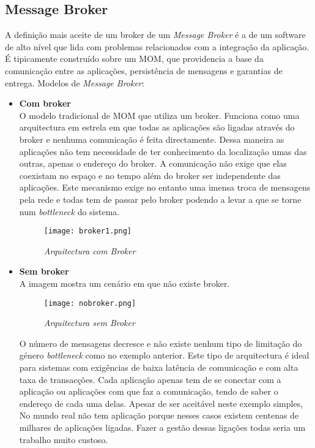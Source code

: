 \subsection{Message Broker}
A definição mais aceite de um broker de um \textit{Message Broker} é a de um software de alto nível que lida com problemas relacionados com a integração da aplicação. É tipicamente construído sobre um MOM, que providencia a base da comunicação entre as aplicações, persistência de mensagens e garantias de entrega. Modelos de \textit{Message Broker}:
\begin{itemize}
\item \textbf{Com broker}\\
 O modelo tradicional de MOM que utiliza um broker. Funciona como uma arquitectura em estrela em que todas as aplicações são ligadas através do broker e nenhuma comunicação é feita directamente. Dessa maneira as aplicações não tem necessidade de ter conhecimento da localização umas das outras, apenas o endereço do broker. A comunicação não exige que elas coexistam no espaço e no tempo além do broker ser independente das aplicações. Este mecanismo exige no entanto uma imensa troca de mensagens pela rede e todas tem de passar pelo broker podendo a levar a que se torne num \textit{bottleneck} do sistema.
\begin{figure}[H]
\centering
\texttt{[image: broker1.png]}
\caption{\textit{Arquitectura com Broker}}
\label{fig:broker}
\end{figure}
\item \textbf{Sem broker}\\
A imagem mostra um cenário em que não existe broker.
\begin{figure}[H]
\centering
\texttt{[image: nobroker.png]}
\caption{\textit{Arquitectura sem Broker}}
\label{fig:nobroker}
\end{figure}
O número de mensagens decresce e não existe nenhum tipo de limitação do género \textit{bottleneck} como no exemplo anterior. Este tipo de arquitectura é ideal para sistemas com exigências de baixa latência de comunicação e com alta taxa de transacções. Cada aplicação apenas tem de se conectar com a aplicação ou aplicações com que faz a comunicação, tendo de saber o endereço de cada uma delas. Apesar de ser aceitável neste exemplo simples,  No  mundo real não tem aplicação porque nesses casos existem centenas de milhares de aplicações ligadas. Fazer a gestão dessas ligações todas seria um trabalho muito custoso.\\

\end{itemize}
